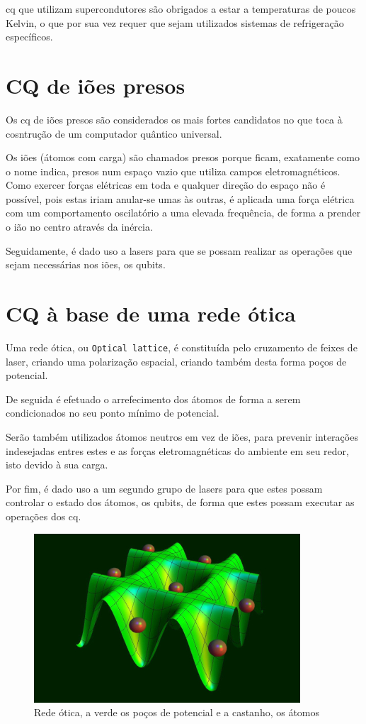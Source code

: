 \documentclass{report}
\begin{document}
	\ac{cq} que utilizam supercondutores são obrigados a estar a temperaturas de poucos Kelvin, o que por sua vez requer que sejam utilizados sistemas de refrigeração específicos.



\section{CQ de iões presos}

	Os \ac{cq} de iões presos são considerados os mais fortes candidatos no que toca à cosntrução de um computador quântico universal. 

	Os iões (átomos com carga) são chamados presos porque ficam, exatamente como o nome indica, presos num espaço vazio que utiliza campos eletromagnéticos.
Como exercer forças elétricas em toda e qualquer  direção do espaço não é possível, pois estas iriam anular-se umas às outras, é aplicada uma força elétrica com um comportamento  oscilatório a uma elevada frequência, de forma a prender o ião no centro através da inércia.


	Seguidamente, é dado uso a lasers para que se possam realizar as operações que sejam necessárias  nos iões, os qubits.

\newpage

\section{CQ à base de uma rede ótica}

	Uma rede ótica, ou \verb|Optical lattice|, é constituída pelo cruzamento de feixes de laser, criando uma polarização espacial, criando também desta forma poços de potencial.


	De seguida  é efetuado o arrefecimento dos átomos de forma a serem condicionados no seu ponto mínimo de potencial.

	Serão também utilizados átomos neutros em vez de iões, para prevenir interações indesejadas entres estes e as forças eletromagnéticas do ambiente em seu redor, isto devido à sua carga.

	Por fim, é dado uso a um segundo grupo de lasers para que estes possam controlar o estado dos átomos, os qubits, de forma que estes possam executar as operações dos \ac{cq}.

\begin{figure}[!h]
	\centering
	\includegraphics[scale=0.5]{redeotica.jpg}
	\caption{Rede ótica, a verde os poços de potencial e a castanho, os átomos}
	\label{Rede otica}
\end{figure}
\end{document}
